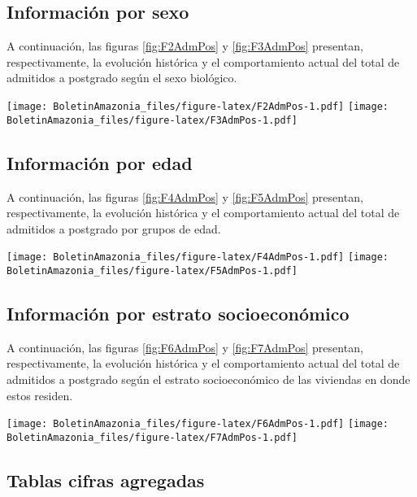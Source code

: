 \documentclass[
]{book}
\begin{document}
\hypertarget{informaciuxf3n-por-sexo-3}{%
\subsection{Información por sexo}\label{informaciuxf3n-por-sexo-3}}

A continuación, las figuras \ref{fig:F2AdmPos} y \ref{fig:F3AdmPos} presentan, respectivamente, la evolución histórica y el comportamiento actual del total de admitidos a postgrado según el sexo biológico.

\texttt{[image: BoletinAmazonia\_files/figure-latex/F2AdmPos-1.pdf]}
\texttt{[image: BoletinAmazonia\_files/figure-latex/F3AdmPos-1.pdf]}

\hypertarget{informaciuxf3n-por-edad-3}{%
\subsection{Información por edad}\label{informaciuxf3n-por-edad-3}}

A continuación, las figuras \ref{fig:F4AdmPos} y \ref{fig:F5AdmPos} presentan, respectivamente, la evolución histórica y el comportamiento actual del total de admitidos a postgrado por grupos de edad.

\texttt{[image: BoletinAmazonia\_files/figure-latex/F4AdmPos-1.pdf]}
\texttt{[image: BoletinAmazonia\_files/figure-latex/F5AdmPos-1.pdf]}

\hypertarget{informaciuxf3n-por-estrato-socioeconuxf3mico-3}{%
\subsection{Información por estrato socioeconómico}\label{informaciuxf3n-por-estrato-socioeconuxf3mico-3}}

A continuación, las figuras \ref{fig:F6AdmPos} y \ref{fig:F7AdmPos} presentan, respectivamente, la evolución histórica y el comportamiento actual del total de admitidos a postgrado según el estrato socioeconómico de las viviendas en donde estos residen.

\texttt{[image: BoletinAmazonia\_files/figure-latex/F6AdmPos-1.pdf]}
\texttt{[image: BoletinAmazonia\_files/figure-latex/F7AdmPos-1.pdf]}

\hypertarget{tablas-cifras-agregadas-3}{%
\subsection{Tablas cifras agregadas}\label{tablas-cifras-agregadas-3}}
\end{document}

